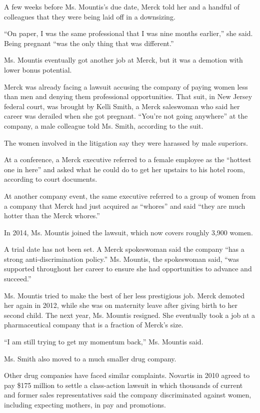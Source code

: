 A few weeks before Ms. Mountis's due date, Merck told her and a handful
of colleagues that they were being laid off in a downsizing.

``On paper, I was the same professional that I was nine months
earlier,'' she said. Being pregnant ``was the only thing that was
different.''

Ms. Mountis eventually got another job at Merck, but it was a demotion
with lower bonus potential.

Merck was already facing a lawsuit accusing the company of paying women
less than men and denying them professional opportunities. That suit, in
New Jersey federal court, was brought by Kelli Smith, a Merck saleswoman
who said her career was derailed when she got pregnant. ``You're not
going anywhere'' at the company, a male colleague told Ms. Smith,
according to the suit.

The women involved in the litigation say they were harassed by male
superiors.

At a conference, a Merck executive referred to a female employee as the
``hottest one in here'' and asked what he could do to get her upstairs
to his hotel room, according to court documents.

At another company event, the same executive referred to a group of
women from a company that Merck had just acquired as ``whores'' and said
``they are much hotter than the Merck whores.''

In 2014, Ms. Mountis joined the lawsuit, which now covers roughly 3,900
women.

A trial date has not been set. A Merck spokeswoman said the company
``has a strong anti-discrimination policy.'' Ms. Mountis, the
spokeswoman said, ``was supported throughout her career to ensure she
had opportunities to advance and succeed.''

Ms. Mountis tried to make the best of her less prestigious job. Merck
demoted her again in 2012, while she was on maternity leave after giving
birth to her second child. The next year, Ms. Mountis resigned. She
eventually took a job at a pharmaceutical company that is a fraction of
Merck's size.

``I am still trying to get my momentum back,'' Ms. Mountis said.

Ms. Smith also moved to a much smaller drug company.

Other drug companies have faced similar complaints. Novartis in 2010
agreed to pay \$175 million to settle a class-action lawsuit in which
thousands of current and former sales representatives said the company
discriminated against women, including expecting mothers, in pay and
promotions.

